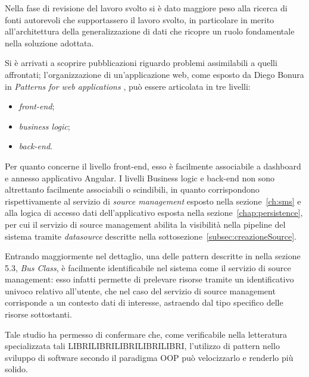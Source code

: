 
Nella fase di revisione del lavoro svolto si è dato maggiore peso alla ricerca di fonti autorevoli che supportassero il lavoro svolto, in particolare in merito all'architettura della generalizzazione di dati che ricopre un ruolo fondamentale nella soluzione adottata.

Si è arrivati a scoprire pubblicazioni riguardo problemi assimilabili a quelli affrontati; l'organizzazione di un'applicazione web, come esposto da Diego Bonura in \textit{Patterns for web applications} \cite{DBLP:conf/seke/BonuraCM02}, può essere articolata in tre livelli:
\begin{itemize}
\item
\textit{front-end};
\item
\textit{business logic};
\item
\textit{back-end}.
\end{itemize}

Per quanto concerne il livello front-end, esso è facilmente associabile a dashboard e annesso applicativo Angular.
I livelli Business logic e back-end non sono altrettanto facilmente associabili o scindibili, in quanto corrispondono rispettivamente al servizio di \textit{source management} esposto nella sezione~\ref{ch:sms} e alla logica di accesso dati dell'applicativo esposta nella sezione~\ref{chap:persistence}, per cui il servizio di source management abilita la visibilità nella pipeline del sistema tramite \textit{datasource} descritte nella sottosezione~\ref{subsec:creazioneSource}.

Entrando maggiormente nel dettaglio, una delle pattern descritte in \cite{DBLP:conf/seke/BonuraCM02} nella sezione 5.3, \textit{Bus Class}, è facilmente identificabile nel sistema come il servizio di source management: esso infatti permette di prelevare risorse tramite un identificativo univoco relativo all'utente, che nel caso del servizio di source management corrisponde a un contesto dati di interesse, astraendo dal tipo specifico delle risorse sottostanti.

Tale studio ha permesso di confermare che, come verificabile nella letteratura specializzata tali LIBRILIBRILIBRILIBRILIBRI, l'utilizzo di pattern nello sviluppo di software secondo il paradigma OOP può velocizzarlo e renderlo più solido.

